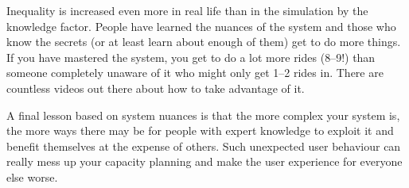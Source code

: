 Inequality is increased even more in real life than in the simulation by the knowledge factor. People have learned the nuances of the system and those who know the secrets (or at least learn about enough of them) get to do more things. If you have mastered the system, you get to do a lot more rides (8--9!) than someone completely unaware of it who might only get 1--2 rides in. There are countless videos out there about how to take advantage of it.

A final lesson based on system nuances is that the more complex your system is, the more ways there may be for people with expert knowledge to exploit it and benefit themselves at the expense of others. Such unexpected user behaviour can really mess up your capacity planning and make the user experience for everyone else worse. 




